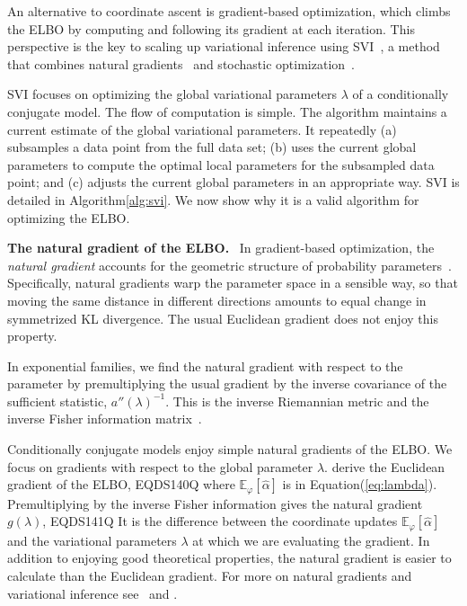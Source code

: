 \documentclass{article}
\DeclareRobustCommand{\parhead}[1]{\textbf{#1}~}
\begin{document}
An alternative to coordinate ascent is gradient-based optimization,
which climbs the \gls{ELBO} by computing and following its gradient at
each iteration. This perspective is the key to scaling up variational
inference using \gls{SVI}~\citep{Hoffman:2013}, a method that combines
natural gradients~\citep{Amari:1998} and stochastic
optimization~\citep{Robbins:1951}.

\gls{SVI} focuses on optimizing the global variational parameters
$\lambda$ of a conditionally conjugate model. The flow of computation
is simple. The algorithm maintains a current estimate of the global
variational parameters. It repeatedly (a) subsamples a data point from
the full data set; (b) uses the current global parameters to compute
the optimal local parameters for the subsampled data point; and (c)
adjusts the current global parameters in an appropriate way. \gls{SVI}
is detailed in Algorithm\nobreakspace \ref {alg:svi}.  We now show why it is a valid
algorithm for optimizing the \gls{ELBO}.

\parhead{The natural gradient of the \gls{ELBO}.}  In gradient-based
optimization, the \textit{natural gradient} accounts for the geometric
structure of probability parameters~\citep{Amari:1982,Amari:1998}.
Specifically, natural gradients warp the parameter space in a sensible
way, so that moving the same distance in different directions amounts
to equal change in symmetrized \gls{KL} divergence.  The usual
Euclidean gradient does not enjoy this property.

In exponential families, we find the natural gradient with respect to
the parameter by premultiplying the usual gradient by the inverse
covariance of the sufficient statistic, $a''(\lambda)^{-1}$.  This is
the inverse Riemannian metric and the inverse Fisher information
matrix~\citep{Amari:1982}.

Conditionally conjugate models enjoy simple natural gradients of the
\gls{ELBO}.  We focus on gradients with respect to the global
parameter $\lambda$.  \citet{Hoffman:2013} derive the Euclidean
gradient of the \gls{ELBO},
EQDS140Q
where ${\mathbb{E}_{{\varphi}}\left[{\hat{\alpha}}\right]}$ is in Equation\nobreakspace \textup {(\ref {eq:lambda})}.
Premultiplying by the inverse Fisher information gives the natural
gradient $g(\lambda)$,
EQDS141Q
It is the difference between the coordinate updates
${\mathbb{E}_{{\varphi}}\left[{\hat{\alpha}}\right]}$ and the variational parameters $\lambda$
at which we are evaluating the gradient.  In addition to enjoying good
theoretical properties, the natural gradient is easier to calculate
than the Euclidean gradient.  For more on natural gradients and
variational inference see~\citet{Sato:2001} and \citet{Honkela:2008}.
\end{document}
